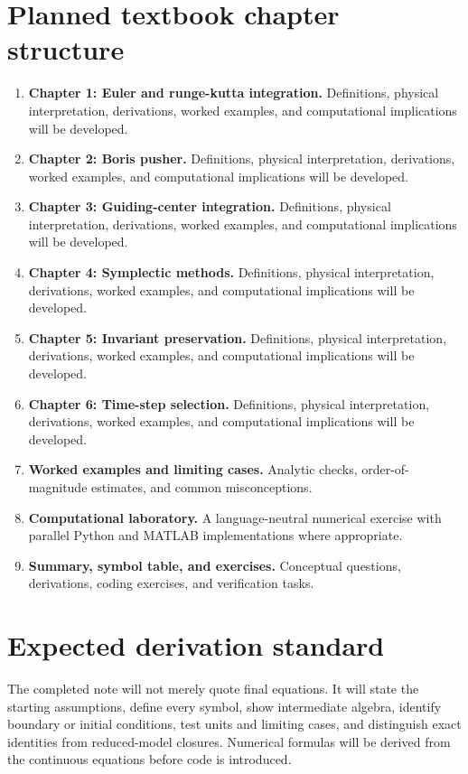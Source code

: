 \documentclass[11pt]{article}
\begin{document}
\section{Planned textbook chapter structure}
\begin{enumerate}[leftmargin=1.8em]
\item \textbf{Chapter 1: Euler and runge-kutta integration.} Definitions, physical interpretation, derivations, worked examples, and computational implications will be developed.
\item \textbf{Chapter 2: Boris pusher.} Definitions, physical interpretation, derivations, worked examples, and computational implications will be developed.
\item \textbf{Chapter 3: Guiding-center integration.} Definitions, physical interpretation, derivations, worked examples, and computational implications will be developed.
\item \textbf{Chapter 4: Symplectic methods.} Definitions, physical interpretation, derivations, worked examples, and computational implications will be developed.
\item \textbf{Chapter 5: Invariant preservation.} Definitions, physical interpretation, derivations, worked examples, and computational implications will be developed.
\item \textbf{Chapter 6: Time-step selection.} Definitions, physical interpretation, derivations, worked examples, and computational implications will be developed.
\item \textbf{Worked examples and limiting cases.} Analytic checks, order-of-magnitude estimates, and common misconceptions.
\item \textbf{Computational laboratory.} A language-neutral numerical exercise with parallel Python and MATLAB implementations where appropriate.
\item \textbf{Summary, symbol table, and exercises.} Conceptual questions, derivations, coding exercises, and verification tasks.
\end{enumerate}

\section{Expected derivation standard}
The completed note will not merely quote final equations. It will state the starting assumptions, define every symbol, show intermediate algebra, identify boundary or initial conditions, test units and limiting cases, and distinguish exact identities from reduced-model closures. Numerical formulas will be derived from the continuous equations before code is introduced.
\end{document}
